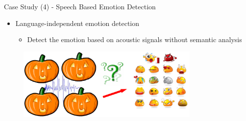 \documentclass[
 size=14pt,
 paper=smartboard,  %
 mode=present, 		%
 display=slides, 	%
 style=tuliplab,  	%
 pauseslide,
 fleqn,leqno]{powerdot}{}
\begin{document}
\begin{slide}[toc=,bm=]{Case Study (4) - Speech Based Emotion Detection}

\begin{itemize}
  \item Language-independent emotion detection

  \begin{itemize}
    \item Detect the emotion based on acoustic signals without semantic analysis

  \end{itemize}
\end{itemize}
\begin{figure}
  \includegraphics[width=0.8\textwidth]{figures//theme1//Theme1_22.eps}
\end{figure}


\footnotesize{}

\end{slide}
\end{document}
